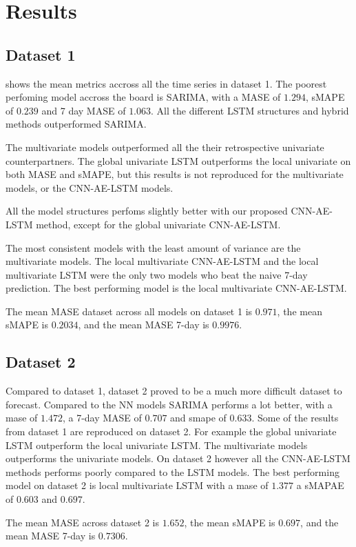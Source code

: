 \section{Results}
\subsection{Dataset 1}
 shows the mean metrics accross
all the time series in dataset 1. The poorest perfoming model accross the board
is SARIMA, with a MASE of $1.294$, sMAPE of $0.239$ and 7 day MASE of $1.063$.
All the different LSTM structures and hybrid methods outperformed SARIMA.

The multivariate models outperformed all the their retrospective univariate counterpartners.
The global univariate LSTM outperforms the local univariate on both MASE and sMAPE,
but this results is not reproduced for the multivariate models, or the CNN-AE-LSTM models.

All the model structures perfoms slightly better with our proposed CNN-AE-LSTM method, except for
the global univariate CNN-AE-LSTM.

The most consistent models with the least amount of variance are the multivariate models.
The local multivariate CNN-AE-LSTM and the local multivariate LSTM were the only two models
who beat the naive 7-day prediction. The best performing model is the local multivariate CNN-AE-LSTM.

The mean MASE dataset across all models on dataset 1 is $0.971$,
the mean sMAPE is $0.2034$,
and the mean MASE 7-day is $0.9976$.


\subsection{Dataset 2}
Compared to dataset 1, dataset 2 proved to be a much more difficult dataset to forecast.
Compared to the NN models SARIMA performs a lot better, with a mase of $1.472$, a 7-day MASE of $0.707$ and smape of $0.633$.
Some of the results from dataset 1 are reproduced on dataset 2. For example the global univariate LSTM outperform
the local univariate LSTM. The multivariate models outperforms the univariate models.
On dataset 2 however all the CNN-AE-LSTM methods performs poorly compared to the LSTM models.
The best performing model on dataset 2 is local multivariate LSTM with a mase of $1.377$ a sMAPAE of $0.603$
and $0.697$.

The mean MASE across dataset 2 is $1.652$,
the mean sMAPE is $0.697$,
and the mean MASE 7-day is  $0.7306$.

